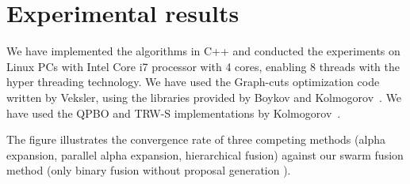 \section{Experimental results}
\label{section:results}
We have implemented the algorithms in C++ and conducted the experiments
on Linux PCs with Intel Core i7 processor with 4 cores, enabling 8 threads
with the hyper threading technology. We have used the Graph-cuts
optimization code written by Veksler, using the libraries provided by
Boykov and Kolmogorov~\cite{middle_bury,2,3,4_below}.
%
%
We have used the QPBO and TRW-S implementations by
Kolmogorov~\cite{msr_link?,trw_link}.



The figure illustrates the convergence rate of three competing methods
(alpha expansion, parallel alpha expansion, hierarchical fusion) against
our swarm fusion method (only binary fusion without proposal
generation ).

